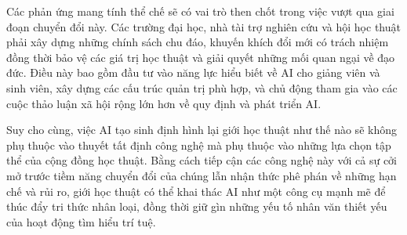 Các phản ứng mang tính thể chế sẽ có vai trò then chốt trong việc vượt qua giai đoạn chuyển đổi này. Các trường đại học, nhà tài trợ nghiên cứu và hội học thuật phải xây dựng những chính sách chu đáo, khuyến khích đổi mới có trách nhiệm đồng thời bảo vệ các giá trị học thuật và giải quyết những mối quan ngại về đạo đức. Điều này bao gồm đầu tư vào năng lực hiểu biết về AI cho giảng viên và sinh viên, xây dựng các cấu trúc quản trị phù hợp, và chủ động tham gia vào các cuộc thảo luận xã hội rộng lớn hơn về quy định và phát triển AI.

Suy cho cùng, việc AI tạo sinh định hình lại giới học thuật như thế nào sẽ không phụ thuộc vào thuyết tất định công nghệ mà phụ thuộc vào những lựa chọn tập thể của cộng đồng học thuật. Bằng cách tiếp cận các công nghệ này với cả sự cởi mở trước tiềm năng chuyển đổi của chúng lẫn nhận thức phê phán về những hạn chế và rủi ro, giới học thuật có thể khai thác AI như một công cụ mạnh mẽ để thúc đẩy tri thức nhân loại, đồng thời giữ gìn những yếu tố nhân văn thiết yếu của hoạt động tìm hiểu trí tuệ.
